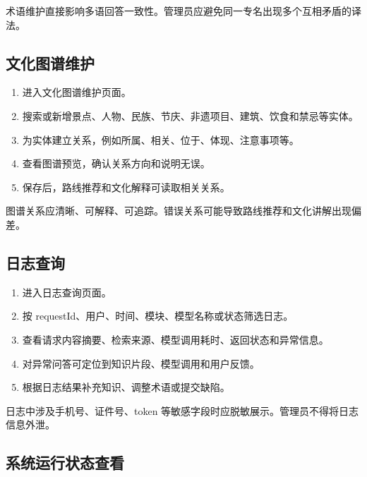 术语维护直接影响多语回答一致性。管理员应避免同一专名出现多个互相矛盾的译法。


\subsection{文化图谱维护}

\begin{enumerate}[leftmargin=2em]
  \item 进入文化图谱维护页面。
  \item 搜索或新增景点、人物、民族、节庆、非遗项目、建筑、饮食和禁忌等实体。
  \item 为实体建立关系，例如所属、相关、位于、体现、注意事项等。
  \item 查看图谱预览，确认关系方向和说明无误。
  \item 保存后，路线推荐和文化解释可读取相关关系。
\end{enumerate}

图谱关系应清晰、可解释、可追踪。错误关系可能导致路线推荐和文化讲解出现偏差。


\subsection{日志查询}

\begin{enumerate}[leftmargin=2em]
  \item 进入日志查询页面。
  \item 按 requestId、用户、时间、模块、模型名称或状态筛选日志。
  \item 查看请求内容摘要、检索来源、模型调用耗时、返回状态和异常信息。
  \item 对异常问答可定位到知识片段、模型调用和用户反馈。
  \item 根据日志结果补充知识、调整术语或提交缺陷。
\end{enumerate}

日志中涉及手机号、证件号、token 等敏感字段时应脱敏展示。管理员不得将日志信息外泄。


\subsection{系统运行状态查看}

